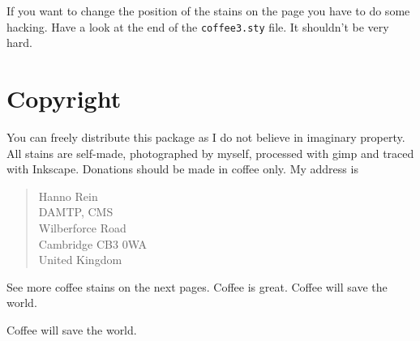 \documentclass{article}
\begin{document}
If you want to change the position of the stains on the page you have to do some hacking. Have a look at the 
end of the \texttt{coffee3.sty} file. It shouldn't be very hard. 

\section{Copyright}
You can freely distribute this package as I do not believe in imaginary property. All stains are self-made, photographed by myself, processed with gimp and traced with Inkscape.
Donations should be made in coffee only. My address is
\begin{quote}
Hanno Rein\\
DAMTP, CMS\\
Wilberforce Road\\
Cambridge CB3 0WA\\
United Kingdom
\end{quote}
See more coffee stains on the next pages.
\newpage
{}
Coffee is great.
\newpage
{}
Coffee will save the world. 

\newpage
{}
Coffee will save the world. 
\end{document}
